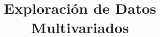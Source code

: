 \newcommand{\subtitulo}{Examen Final. Modalidad: libre}
\title{Exploraci\'on de Datos Multivariados}